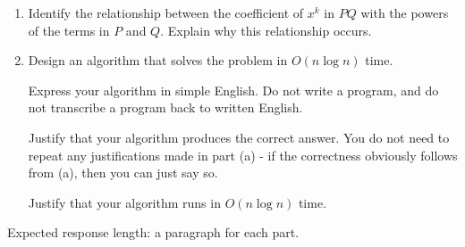 \documentclass[12pt]{article}
\begin{document}
\newpage
\begin{rubric}
\begin{enumerate}
    \item Identify the relationship between the coefficient of $x^k$ in $PQ$ with the powers of the terms in $P$ and $Q$. Explain why this relationship occurs.

    \item Design an algorithm that solves the problem in $O(n \log n)$ time. 
    
    Express your algorithm in simple English. Do not write a program, and do not transcribe a program back to written English.

    Justify that your algorithm produces the correct answer. You do not need to repeat any justifications made in part (a) - if the correctness obviously follows from (a), then you can just say so.

    Justify that your algorithm runs in $O(n \log n)$ time.
\end{enumerate}
Expected response length: a paragraph for each part.
\end{rubric}

\begin{solution}
\end{solution}

\begin{attribution}
\end{attribution}
\end{document}
